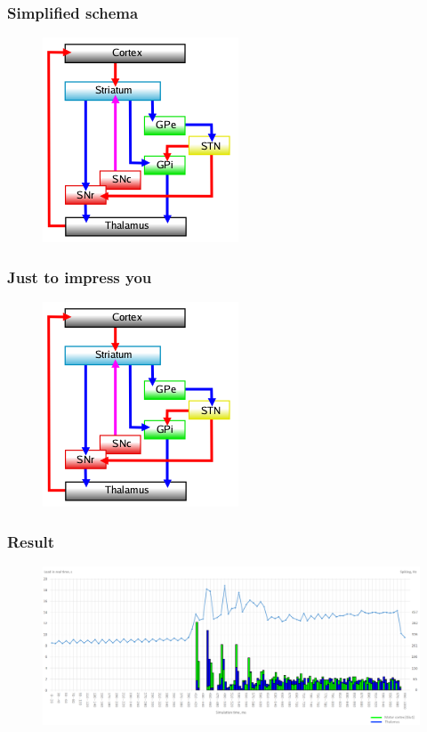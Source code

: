 \documentclass[12pt]{beamer}
\begin{document}
\begin{frame}
\frametitle{Simplified schema}
\begin{figure}
\includegraphics[width=0.5\linewidth]{nigrostriatal}
\end{figure}
\end{frame}


\begin{frame}
\frametitle{Just to impress you}
\begin{figure}
\includegraphics[width=0.5\linewidth]{nigrostriatal}
\end{figure}
\end{frame}


\begin{frame}
\frametitle{Result}
\begin{figure}
\includegraphics[width=1.0\textwidth]{resultBIG}
\end{figure}
\end{frame}
\end{document}
